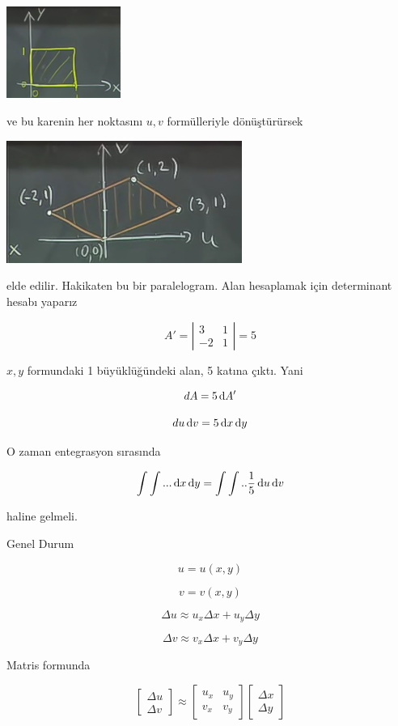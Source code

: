 \documentclass[12pt,fleqn]{article}\usepackage{../../common}
\begin{document}
\begin{center}
\includegraphics[height=3cm]{18_4.png}
\end{center}

ve bu karenin her noktasını $u,v$ formülleriyle dönüştürürsek

\begin{center}
\includegraphics[height=4cm]{18_5.png}
\end{center}

elde edilir. Hakikaten bu bir paralelogram. Alan hesaplamak için
determinant hesabı yaparız

$$ A' = 
\left|\begin{array}{rr}
3 & 1 \\
-2 & 1
\end{array}\right| = 5
 $$

$x,y$ formundaki 1 büyüklüğündeki alan, 5 katına çıktı. Yani 

$$ dA = 5 \,\mathrm{d} A' $$

$$ du \,\mathrm{d} v = 5 \,\mathrm{d} x \,\mathrm{d} y $$

O zaman entegrasyon sırasında 

$$ \int \int ... \,\mathrm{d} x \,\mathrm{d} y = \int \int ..  \frac{1}{5} \,\mathrm{d} u \,\mathrm{d} v $$

haline gelmeli. 

Genel Durum 

$$ u = u(x,y) $$

$$ v = v(x,y)  $$

$$ \Delta u \approx u_x \Delta x + u_y \Delta y  $$

$$ \Delta v \approx v_x \Delta x + v_y \Delta y  $$

Matris formunda 

$$ 
\left[\begin{array}{r}
\Delta u \\
\Delta v 
\end{array}\right] \approx 
\left[\begin{array}{rr}
u_x & u_y \\
v_x & v_y
\end{array}\right] 
\left[\begin{array}{r}
\Delta x \\
\Delta y 
\end{array}\right] 
$$
\end{document}
